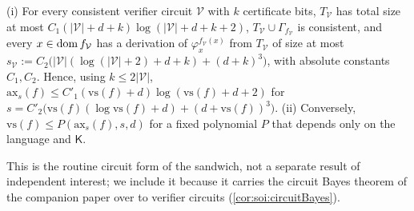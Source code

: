 \begin{theorem}\label{thm:soi:circuit}
(i) For every consistent verifier circuit $\mathcal V$ with $k$ certificate bits, $T_{\mathcal V}$ has total size at most $C_1(\lvert\mathcal V\rvert+d+k)\log(\lvert\mathcal V\rvert+d+k+2)$, $T_{\mathcal V}\cup\Gamma_{f_{\mathcal V}}$ is consistent, and every $x\in\operatorname{dom} f_{\mathcal V}$ has a derivation of $\varphi_x^{f_{\mathcal V}(x)}$ from $T_{\mathcal V}$ of size at most $s_{\mathcal V}:=C_2\big(\lvert\mathcal V\rvert(\log(\lvert\mathcal V\rvert+2)+d+k)+(d+k)^3\big)$, with absolute constants $C_1,C_2$. Hence, using $k\le2\lvert\mathcal V\rvert$, $\mathrm{ax}_s(f)\le C'_1(\mathrm{vs}(f)+d)\log(\mathrm{vs}(f)+d+2)$ for $s=C'_2\big(\mathrm{vs}(f)(\log\mathrm{vs}(f)+d)+(d+\mathrm{vs}(f))^3\big)$.
(ii) Conversely, $\mathrm{vs}(f)\le P(\mathrm{ax}_s(f),s,d)$ for a fixed polynomial $P$ that depends only on the language and $\mathsf K$.
\end{theorem}

This is the routine circuit form of the sandwich, not a separate result of independent interest; we include it because it carries the circuit Bayes theorem of the companion paper over to verifier circuits (\cref{cor:soi:circuitBayes}).

